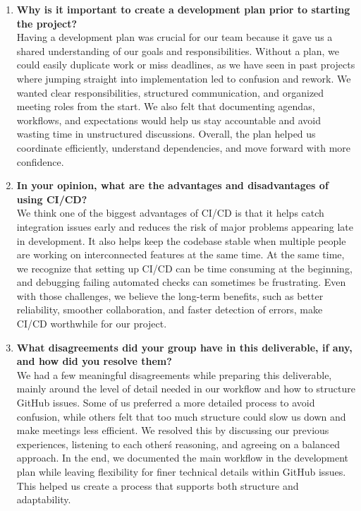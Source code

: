 \documentclass{article}
\begin{document}
\begin{enumerate}
  \item \textbf{Why is it important to create a development plan prior to starting the
  project?}
  \\Having a development plan was crucial for our team because it gave us a shared understanding
  of our goals and responsibilities. Without a plan, we could easily duplicate work or miss deadlines,
  as we have seen in past projects where jumping straight into implementation led to confusion and rework.
  We wanted clear responsibilities, structured communication, and organized meeting roles from the start.
  We also felt that documenting agendas, workflows, and expectations would help us stay accountable and avoid
  wasting time in unstructured discussions. Overall, the plan helped us coordinate efficiently, understand
  dependencies, and move forward with more confidence.
  \item \textbf{In your opinion, what are the advantages and disadvantages of using
  CI/CD?}
  \\We think one of the biggest advantages of CI/CD is that it helps catch integration issues early and reduces
  the risk of major problems appearing late in development. It also helps keep the codebase stable when multiple
  people are working on interconnected features at the same time. At the same time, we recognize that setting up
  CI/CD can be time consuming at the beginning, and debugging failing automated checks can sometimes be frustrating.
  Even with those challenges, we believe the long-term benefits, such as better reliability, smoother collaboration,
  and faster detection of errors, make CI/CD worthwhile for our project.
  \item \textbf{What disagreements did your group have in this deliverable, if any,
  and how did you resolve them?}
  \\We had a few meaningful disagreements while preparing this deliverable, mainly around the level of detail
  needed in our workflow and how to structure GitHub issues. Some of us preferred a more detailed process to avoid
  confusion, while others felt that too much structure could slow us down and make meetings less efficient. We resolved
  this by discussing our previous experiences, listening to each other\'s reasoning, and agreeing on a balanced approach.
  In the end, we documented the main workflow in the development plan while leaving flexibility for finer technical details
  within GitHub issues. This helped us create a process that supports both structure and adaptability.
  \end{enumerate}
\end{document}
